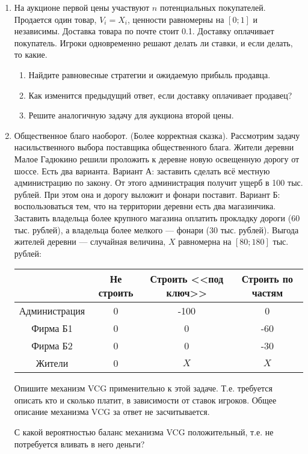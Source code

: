 \begin{enumerate}
\item На аукционе первой цены участвуют $ n $ потенциальных покупателей. Продается один товар, $ V_{i}=X_{i} $, ценности равномерны на $ [0;1] $ и независимы. Доставка товара по почте стоит 0.1. Доставку оплачивает покупатель. Игроки одновременно решают делать ли ставки, и если делать, то какие. 

\begin{enumerate}
\item Найдите равновесные стратегии и ожидаемую прибыль продавца.
\item Как изменится предыдущий ответ, если доставку оплачивает продавец?
\item Решите аналогичную задачу для аукциона второй цены.
\end{enumerate}


\item Общественное благо наоборот. (Более корректная сказка). Рассмотрим задачу насильственного выбора поставщика общественного блага. Жители деревни Малое Гадюкино решили проложить к деревне новую освещенную дорогу от шоссе. Есть два варианта. Вариант А: заставить сделать всё местную администрацию по закону. От этого администрация получит ущерб в 100 тыс. рублей. При этом она и дорогу выложит и фонари поставит. Вариант Б: воспользоваться тем, что на территории деревни есть два магазинчика. Заставить владельца более крупного магазина оплатить прокладку дороги (60 тыс. рублей), а владельца более мелкого --- фонари (30 тыс. рублей). Выгода жителей деревни --- случайная величина, $ X $ равномерна на $ [80;180] $ тыс. рублей:

\begin{tabular}{c|ccc}
& Не строить & Строить <<под ключ>> & Строить по частям \\ 
\hline 
Администрация & 0 & -100 & 0\\ 
Фирма Б1 & 0 & 0 & -60\\ 
Фирма Б2 & 0 & 0 & -30\\ 
Жители & 0 & $X$ & $X$\\ 
\end{tabular} 

Опишите механизм VCG применительно к этой задаче. Т.е. требуется описать кто и сколько платит, в зависимости от ставок игроков. Общее описание механизма VCG за ответ не засчитывается.

С какой вероятностью баланс механизма VCG положительный, т.е. не потребуется вливать в него деньги?



\end{enumerate}
